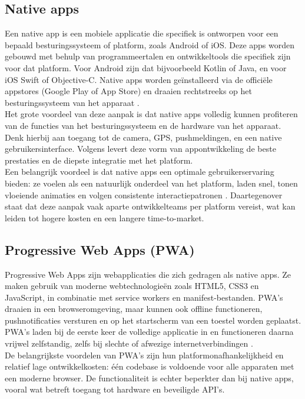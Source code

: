 \subsection{Native apps}
Een native app is een mobiele applicatie die specifiek is ontworpen voor een bepaald besturingssysteem of platform, zoals Android of iOS. Deze apps worden gebouwd met behulp van programmeertalen en ontwikkeltools die specifiek zijn voor dat platform. Voor Android zijn dat bijvoorbeeld Kotlin of Java, en voor iOS Swift of Objective-C. Native apps worden geïnstalleerd via de officiële appstores (Google Play of App Store) en draaien rechtstreeks op het besturingssysteem van het apparaat \autocite{Jobe2013}.\\

Het grote voordeel van deze aanpak is dat native apps volledig kunnen profiteren van de functies van het besturingssysteem en de hardware van het apparaat. Denk hierbij aan toegang tot de camera, GPS, pushmeldingen, en een native gebruikersinterface. Volgens \textcite{PokuMarboah2021} levert deze vorm van appontwikkeling de beste prestaties en de diepste integratie met het platform.\\

Een belangrijk voordeel is dat native apps een optimale gebruikerservaring bieden: ze voelen als een natuurlijk onderdeel van het platform, laden snel, tonen vloeiende animaties en volgen consistente interactiepatronen \autocite{PokuMarboah2021}. Daartegenover staat dat deze aanpak vaak aparte ontwikkelteams per platform vereist, wat kan leiden tot hogere kosten en een langere time-to-market.

\subsection{Progressive Web Apps (PWA)}  
Progressive Web Apps zijn webapplicaties die zich gedragen als native apps. Ze maken gebruik van moderne webtechnologieën zoals HTML5, CSS3 en JavaScript, in combinatie met service workers en manifest-bestanden. PWA’s draaien in een browseromgeving, maar kunnen ook offline functioneren, pushnotificaties versturen en op het startscherm van een toestel worden geplaatst. PWA’s laden bij de eerste keer de volledige applicatie in en functioneren daarna vrijwel zelfstandig, zelfs bij slechte of afwezige internetverbindingen \autocite{Magomadov2020}.\\

De belangrijkste voordelen van PWA’s zijn hun platformonafhankelijkheid en relatief lage ontwikkelkosten: één codebase is voldoende voor alle apparaten met een moderne browser. De functionaliteit is echter beperkter dan bij native apps, vooral wat betreft toegang tot hardware en beveiligde API’s.\\  

